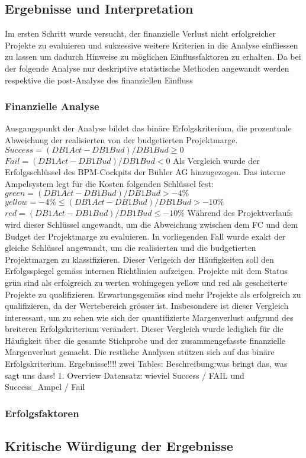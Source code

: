 \subsection{Ergebnisse und Interpretation}
Im ersten Schritt wurde versucht, der finanzielle Verlust nicht erfolgreicher Projekte zu evaluieren und sukzessive weitere Kriterien in die Analyse einfliessen zu lassen um dadurch Hinweise zu möglichen Einflussfaktoren zu erhalten. Da bei der folgende Analyse nur deskriptive statistische Methoden angewandt werden respektive die post-Analyse des finanziellen Einfluss 
\subsubsection{Finanzielle Analyse}
Ausgangspunkt der Analyse bildet das binäre Erfolgskriterium, die prozentuale Abweichung der realisierten von der budgetierten Projektmarge.
\newline\newline
$Success = (DB1Act-DB1Bud)/DB1Bud \geq 0$\newline\newline
$Fail = (DB1Act-DB1Bud)/DB1Bud < 0$
\newline\newline
Als Vergleich wurde der Erfolgsschlüssel des BPM-Cockpits der Bühler AG hinzugezogen. Das interne Ampelsystem  legt für die Kosten folgenden Schlüssel fest:\newline\newline
$ green = (DB1Act-DB1Bud)/DB1Bud > -4\%$\newline\newline
$ yellow = -4\% \leq (DB1Act-DB1Bud)/DB1Bud > -10\%$\newline\newline
$ red = (DB1Act-DB1Bud)/DB1Bud  \leq -10\%$\newline\newline
Während des Projektverlaufs wird dieser Schlüssel angewandt, um die Abweichung zwischen dem FC und dem Budget der Projektmarge zu evaluieren. In vorliegenden Fall wurde exakt der gleiche Schlüssel angewandt, um die realisierten und die budgetierten Projektmargen zu klassifizieren. Dieser Verlgeich der Häufigkeiten soll den Erfolgsspiegel gemäss internen Richtlinien aufzeigen.  Projekte mit dem Status grün sind als erfolgreich zu werten wohingegen yellow und red als gescheiterte Projekte zu qualifizieren. Erwartungsgemäss sind mehr Projekte als erfolgreich zu qualifizieren, da der Wertebereich grösser ist. Insbesondere ist dieser Vergleich interessant, um zu sehen wie sich der quantifizierte Margenverlust aufgrund des breiteren Erfolgskriterium verändert. Dieser Vergleich wurde lediglich für die Häufigkeit über die gesamte Stichprobe und der zusammengefasste finanzielle Margenverlust gemacht. Die restliche Analysen stützen sich auf das binäre Erfolgskriterium. 
Ergebnisse!!!! zwei Tables: Beschreibung:was bringt das, was sagt uns dass! 
1. Overview Datensatz: wieviel Success / FAIL und Success_Ampel / Fail

\subsubsection{Erfolgsfaktoren}
\subsection{Kritische Würdigung der Ergebnisse}
\newpage	
	


